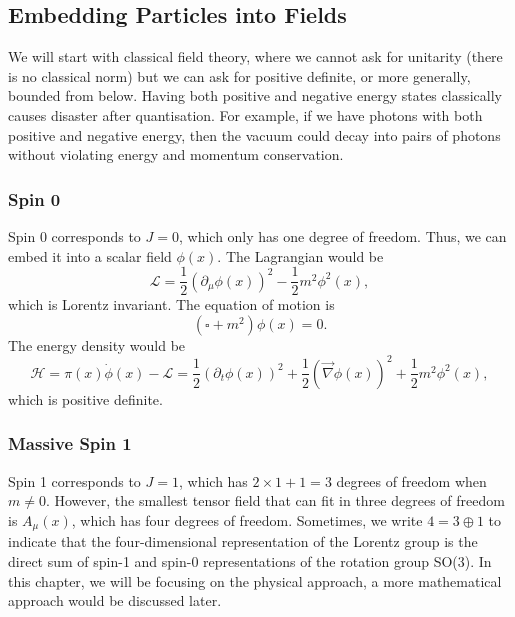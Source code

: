 \documentclass[11pt]{article}
\theoremstyle{definition}
\begin{document}
\subsection{Embedding Particles into Fields}
We will start with classical field theory, where we cannot ask for unitarity (there is no classical norm) but we can ask for positive definite, or more generally, bounded from below. Having both positive and negative energy states classically causes disaster after quantisation. For example, if we have photons with both positive and negative energy, then the vacuum could decay into pairs of photons without violating energy and momentum conservation.

\subsubsection{Spin 0}
Spin 0 corresponds to $J=0$, which only has one degree of freedom. Thus, we can embed it into a scalar field $\phi(x)$. The Lagrangian would be
\begin{equation}
    \mathcal{L} = \frac{1}{2}(\partial_\mu\phi(x))^2 - \frac{1}{2}m^2\phi^2(x),
\end{equation}
which is Lorentz invariant. The equation of motion is 
\begin{equation}
    (\square + m^2)\phi(x) = 0.
\end{equation}
The energy density would be
\begin{equation}
    \mathcal{H} = \pi(x)\dot{\phi}(x) - \mathcal{L} = \frac{1}{2}(\partial_t\phi(x))^2 +\frac{1}{2}(\vec{\nabla}\phi(x))^2 +  \frac{1}{2}m^2\phi^2(x),
\end{equation}
which is positive definite. 

\subsubsection{Massive Spin 1}
Spin 1 corresponds to $J=1$, which has $2\times1 + 1=3$ degrees of freedom when $m \neq 0$. However, the smallest tensor field that can fit in three degrees of freedom is $A_\mu(x)$, which has four degrees of freedom. Sometimes, we write $4=3\oplus1$ to indicate that the four-dimensional representation of the Lorentz group is the direct sum of spin-1 and spin-0 representations of the rotation group SO(3). In this chapter, we will be focusing on the physical approach, a more mathematical approach would be discussed later.
\end{document}
